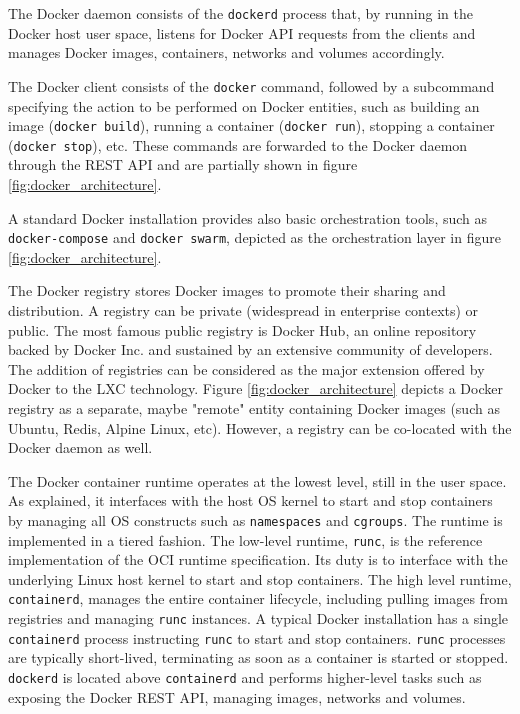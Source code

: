 The Docker daemon consists of the \texttt{dockerd} process that, by running in the Docker host user space, listens for Docker API requests from the clients and manages Docker images, containers, networks and volumes accordingly. 

The Docker client consists of the \texttt{docker} command, followed by a subcommand specifying the action to be performed on Docker entities, such as building an image (\texttt{docker build}), running a container (\texttt{docker run}), stopping a container (\texttt{docker stop}), etc. 
These commands are forwarded to the Docker daemon through the REST API and are partially shown in figure \ref{fig:docker_architecture}.

A standard Docker installation provides also basic orchestration tools, such as \texttt{docker-compose} and \texttt{docker swarm}, depicted as the orchestration layer in figure \ref{fig:docker_architecture}.

The Docker registry stores Docker images to promote their sharing and distribution. A registry can be private (widespread in enterprise contexts) or public. The most famous public registry is Docker Hub, an online repository backed by Docker Inc. and sustained by an extensive community of developers. 
The addition of registries can be considered as the major extension offered by Docker to the LXC technology. Figure \ref{fig:docker_architecture} depicts a Docker registry as a separate, maybe "remote" entity containing Docker images (such as Ubuntu, Redis, Alpine Linux, etc). However, a registry can be co-located with the Docker daemon as well.

The Docker container runtime operates at the lowest level, still in the user space. As explained, it interfaces with the host OS kernel to start and stop containers by managing all OS constructs such as \texttt{namespaces} and \texttt{cgroups}.
The runtime is implemented in a tiered fashion. The low-level runtime, \texttt{runc}, is the reference implementation of the OCI runtime specification. Its duty is to interface with the underlying Linux host kernel to start and stop containers. The high level runtime, \texttt{containerd}, manages the entire container lifecycle, including pulling images from registries and managing \texttt{runc} instances. \newline
A typical Docker installation has a single \texttt{containerd} process instructing \texttt{runc} to start and stop containers. \texttt{runc} processes are typically short-lived, terminating as soon as a container is started or stopped. \newline
\texttt{dockerd} is located above \texttt{containerd} and performs higher-level tasks such as exposing the Docker REST API, managing images, networks and volumes. 

